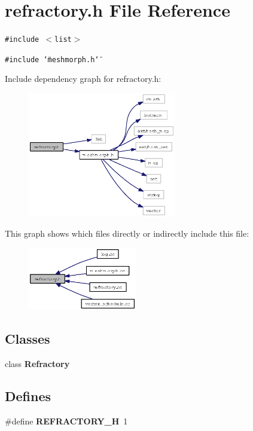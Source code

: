 \section{refractory.h File Reference}
\label{refractory_8h}
{\tt \#include $<$list$>$}\par
{\tt \#include \char`\"{}meshmorph.h\char`\"{}}\par


Include dependency graph for refractory.h:\begin{figure}[H]
\begin{center}
\leavevmode
\includegraphics[width=183pt]{refractory_8h__incl}
\end{center}
\end{figure}


This graph shows which files directly or indirectly include this file:\begin{figure}[H]
\begin{center}
\leavevmode
\includegraphics[width=134pt]{refractory_8h__dep__incl}
\end{center}
\end{figure}
\subsection*{Classes}
\begin{CompactItemize}
\item 
class {\bf Refractory}
\end{CompactItemize}
\subsection*{Defines}
\begin{CompactItemize}
\item 
\#define {\bf REFRACTORY\_\-H}~1
\end{CompactItemize}
